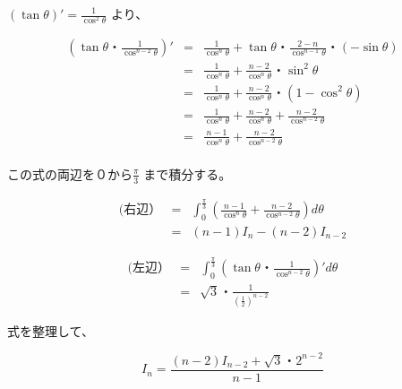\documentclass[a4j, 12pt]{jarticle}
\begin{document}
$ ( \tan \theta)' = \frac{1}{\cos^2 \theta} $ より、

\begin{eqnarray}
 ( \tan \theta ・ \frac{1}{\cos^{n-2} \theta}) '
& = & \frac{1}{\cos^n \theta} +  \tan \theta ・  \frac{2-n}{\cos^{n-1} \theta} ・ ( - \sin \theta) \\
& = & \frac{1}{\cos^n \theta} +  \frac{n-2}{\cos^{n} \theta} ・ \sin^2 \theta \\
& = & \frac{1}{\cos^n \theta} +  \frac{n-2}{\cos^{n} \theta} ・ (1 -  \cos^2 \theta ) \\
& = & \frac{1}{\cos^n \theta} +  \frac{n-2}{\cos^{n} \theta} + \frac{n-2}{\cos^{n-2} \theta} \\
& = & \frac{n-1}{\cos^{n} \theta} + \frac{n-2}{\cos^{n-2} \theta} \\
\end{eqnarray}

この式の両辺を０から$\frac{\pi}{3}$ まで積分する。

\begin{eqnarray}
(右辺） 
& = &  \int_{0}^{\frac{\pi}{3}} (\frac{n-1}{\cos^{n} \theta} + \frac{n-2}{\cos^{n-2} \theta} ) d\theta \\
& = & (n-1)I_{n} - (n-2) I_{n-2}
\end{eqnarray}

\begin{eqnarray}
(左辺） 
& = &  \int_{0}^{\frac{\pi}{3}} ( \tan \theta ・ \frac{1}{\cos^{n-2} \theta}) 'd\theta \\
& = &　\sqrt{3}・\frac{1}{(\frac{1}{2})^{n-2}}
\end{eqnarray}

式を整理して、

\begin{equation}
I_{n}=\frac{(n-2)I_{n-2}+\sqrt{3}・2^{n-2}}{n-1}
\end{equation}
\end{document}
